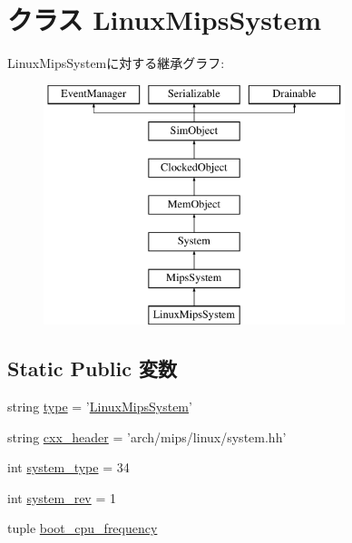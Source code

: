 \hypertarget{classMipsSystem_1_1LinuxMipsSystem}{
\section{クラス LinuxMipsSystem}
\label{classMipsSystem_1_1LinuxMipsSystem}
}
LinuxMipsSystemに対する継承グラフ:\begin{figure}[H]
\begin{center}
\leavevmode
\includegraphics[height=7cm]{classMipsSystem_1_1LinuxMipsSystem}
\end{center}
\end{figure}
\subsection*{Static Public 変数}
\begin{DoxyCompactItemize}
\item 
string \hyperlink{classMipsSystem_1_1LinuxMipsSystem_acce15679d830831b0bbe8ebc2a60b2ca}{type} = '\hyperlink{classMipsSystem_1_1LinuxMipsSystem}{LinuxMipsSystem}'
\item 
string \hyperlink{classMipsSystem_1_1LinuxMipsSystem_a17da7064bc5c518791f0c891eff05fda}{cxx\_\-header} = 'arch/mips/linux/system.hh'
\item 
int \hyperlink{classMipsSystem_1_1LinuxMipsSystem_acfe3506cfe10e05a2cb2c2973dc5dad2}{system\_\-type} = 34
\item 
int \hyperlink{classMipsSystem_1_1LinuxMipsSystem_a261e4081ddd1f0823eccc0f042086c27}{system\_\-rev} = 1
\item 
tuple \hyperlink{classMipsSystem_1_1LinuxMipsSystem_aab5259ecbb88c819a4bf9bd03c47b3d9}{boot\_\-cpu\_\-frequency}
\end{DoxyCompactItemize}


